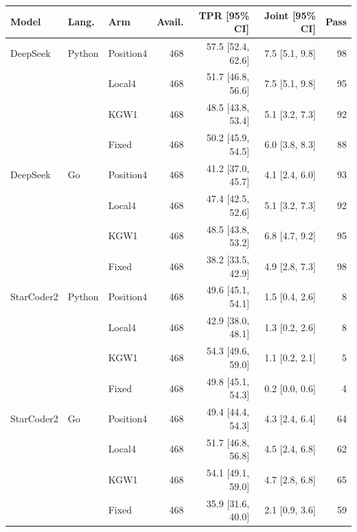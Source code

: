 \begin{tabular}{lllrrrr}
\toprule
Model & Lang. & Arm & Avail. & TPR [95\% CI] & Joint [95\% CI] & Pass \\
\midrule
DeepSeek & Python & Position4 & 468 & 57.5 [52.4, 62.6] & 7.5 [5.1, 9.8] & 98 \\
 &  & Local4 & 468 & 51.7 [46.8, 56.6] & 7.5 [5.1, 9.8] & 95 \\
 &  & KGW1 & 468 & 48.5 [43.8, 53.4] & 5.1 [3.2, 7.3] & 92 \\
 &  & Fixed & 468 & 50.2 [45.9, 54.5] & 6.0 [3.8, 8.3] & 88 \\
DeepSeek & Go & Position4 & 468 & 41.2 [37.0, 45.7] & 4.1 [2.4, 6.0] & 93 \\
 &  & Local4 & 468 & 47.4 [42.5, 52.6] & 5.1 [3.2, 7.3] & 92 \\
 &  & KGW1 & 468 & 48.5 [43.8, 53.2] & 6.8 [4.7, 9.2] & 95 \\
 &  & Fixed & 468 & 38.2 [33.5, 42.9] & 4.9 [2.8, 7.3] & 98 \\
StarCoder2 & Python & Position4 & 468 & 49.6 [45.1, 54.1] & 1.5 [0.4, 2.6] & 8 \\
 &  & Local4 & 468 & 42.9 [38.0, 48.1] & 1.3 [0.2, 2.6] & 8 \\
 &  & KGW1 & 468 & 54.3 [49.6, 59.0] & 1.1 [0.2, 2.1] & 5 \\
 &  & Fixed & 468 & 49.8 [45.1, 54.3] & 0.2 [0.0, 0.6] & 4 \\
StarCoder2 & Go & Position4 & 468 & 49.4 [44.4, 54.3] & 4.3 [2.4, 6.4] & 64 \\
 &  & Local4 & 468 & 51.7 [46.8, 56.8] & 4.5 [2.4, 6.8] & 62 \\
 &  & KGW1 & 468 & 54.1 [49.1, 59.0] & 4.7 [2.8, 6.8] & 65 \\
 &  & Fixed & 468 & 35.9 [31.6, 40.0] & 2.1 [0.9, 3.6] & 59 \\
\bottomrule
\end{tabular}
